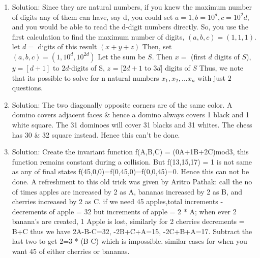 \begin{enumerate}
\item
Solution: Since they are natural numbers, if you knew the maximum number of digits any of them can have, say d, you could set $a=1, b=10^d, c=10^2d$, and you would be able to read the d-digit numbers directly. So, you use the first calculation to find the maximum number of digits, $(a,b,c)=(1,1,1)$.  let $d =$ digits of this result $(x+y+z)$
Then, set $(a,b,c) = (1, 10^d, 10^{2d})$ Let the sum be $S$.
Then $x =$ (first $d$ digits of $S$), $y = [d+1]$ to $2d$-digits of S, $z$ = $[2d+1$ to $3d]$ digits of $S$
Thus, we note that its possible to solve for n natural numbers $x_1,x_2,...x_n$ with just $2$ questions.




\item
Solution: The two diagonally opposite corners are of the same color. A domino covers adjacent faces \& hence a domino always covers 1 black and 1 white square. The 31 dominoes will cover 31 blacks and 31 whites. The chess has 30 \& 32 square instead. Hence this can't be done.




\item
Solution: Create the invariant function f(A,B,C) = (0A+1B+2C)mod3, this function remains constant during a collision. But f(13,15,17) = 1 is not same as any of final states f(45,0,0)=f(0,45,0)=f(0,0,45)=0. Hence this can not be done.
A refreshment to this old trick was given by Aritro Pathak:
call the no of times apples are increased by 2 as A, bananas increased by 2 as B, and cherries increased by 2 as C. if we need 45 apples,total increments - decrements of apple = 32
but increments of apple = 2 * A;
when ever 2 banana's are created, 1 Apple is lost, similarly for 2 cherries
decrements = B+C
thus we have 2A-B-C=32, -2B+C+A=15, -2C+B+A=17. Subtract the last two to get 2=3 * (B-C) which is impossible. similar cases for when you want 45 of either cherries or bananas.





\end{enumerate}
